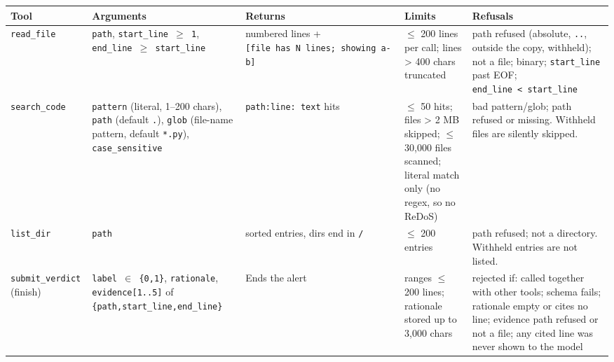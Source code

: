 \documentclass[
  10pt,
]{article}
\newcounter{none} %
\begin{document}
{\def\LTcaptype{none} %
\begin{longtable}[]{@{}
  >{\raggedright\arraybackslash}p{}
  >{\raggedright\arraybackslash}p{}
  >{\raggedright\arraybackslash}p{}
  >{\raggedright\arraybackslash}p{}
  >{\raggedright\arraybackslash}p{}@{}}
\toprule\noalign{}
\begin{minipage}[b]{\linewidth}\raggedright
Tool
\end{minipage} & \begin{minipage}[b]{\linewidth}\raggedright
Arguments
\end{minipage} & \begin{minipage}[b]{\linewidth}\raggedright
Returns
\end{minipage} & \begin{minipage}[b]{\linewidth}\raggedright
Limits
\end{minipage} & \begin{minipage}[b]{\linewidth}\raggedright
Refusals
\end{minipage} \\
\midrule\noalign{}
\endhead
\bottomrule\noalign{}
\endlastfoot
\texttt{read\_file} & \texttt{path}, \texttt{start\_line\ \ensuremath{\geq}\ 1},
\texttt{end\_line\ \ensuremath{\geq}\ start\_line} & numbered lines +
\texttt{{[}file\ has\ N\ lines;\ showing\ a-b{]}} & \ensuremath{\leq} 200 lines per
call; lines \textgreater{} 400 chars truncated & path refused (absolute,
\texttt{..}, outside the copy, withheld); not a file; binary;
\texttt{start\_line} past EOF;
\texttt{end\_line\ \textless{}\ start\_line} \\
\texttt{search\_code} & \texttt{pattern} (literal, 1--200 chars),
\texttt{path} (default \texttt{.}), \texttt{glob} (file-name pattern,
default \texttt{*.py}), \texttt{case\_sensitive} &
\texttt{path:line:\ text} hits & \ensuremath{\leq} 50 hits; files \textgreater{} 2 MB
skipped; \ensuremath{\leq} 30,000 files scanned; literal match only (no regex, so no
ReDoS) & bad pattern/glob; path refused or missing. Withheld files are
silently skipped. \\
\texttt{list\_dir} & \texttt{path} & sorted entries, dirs end in
\texttt{/} & \ensuremath{\leq} 200 entries & path refused; not a directory. Withheld
entries are not listed. \\
\texttt{submit\_verdict} (finish) & \texttt{label\ \ensuremath{\in}\ \{0,1\}},
\texttt{rationale}, \texttt{evidence{[}1..5{]}} of
\texttt{\{path,start\_line,end\_line\}} & Ends the alert & ranges \ensuremath{\leq} 200
lines; rationale stored up to 3,000 chars & rejected if: called together
with other tools; schema fails; rationale empty or cites no line;
evidence path refused or not a file; any cited line was never shown to
the model \\
\end{longtable}
}
\end{document}

